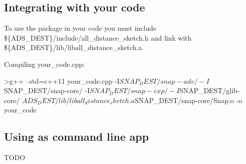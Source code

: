 \subsection*{Integrating with your code}

To use the package in your code you must include \$\{A\+D\+S\+\_\+\+D\+E\+S\+T\}/include/all\+\_\+distance\+\_\+sketch.h and link with \$\{A\+D\+S\+\_\+\+D\+E\+S\+T\}/lib/liball\+\_\+distance\+\_\+sketch.a

Compiling your\+\_\+code.\+cpp\+:

\begin{DoxyVerb}>g++ --std=c++11  your_code.cpp -I${SNAP_DEST}/snap-adv/ -I${SNAP_DEST}/snap-core/ -I${SNAP_DEST}/snap-exp/ -I${SNAP_DEST}/glib-core/  ${ADS_DEST}/lib/liball_distance_sketch.a ${SNAP_DEST}/snap-core/Snap.o  -o your_code
\end{DoxyVerb}


\subsection*{Using as command line app}

T\+O\+D\+O 